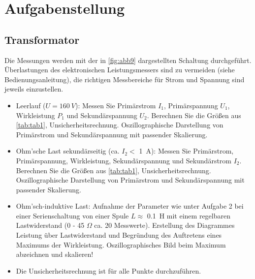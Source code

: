\documentclass[11pt,ngerman]{scrartcl}
\begin{document}

\tableofcontents
\newpage

\section{Aufgabenstellung\label{sec:Auf0}\cite{vorlagetrafo}}

\subsection{Transformator}

Die Messungen werden mit der in \autoref{fig:abb9} dargestellten Schaltung durchgeführt. Überlastungen
des elektronischen Leistungsmessers sind zu vermeiden (siehe Bedienungsanleitung), die richtigen
Messbereiche für Strom und Spannung sind jeweils einzustellen.\cite{vorlagetrafo}

\begin{itemize}
	\item Leerlauf ($U = \SI{160}{V}$): Messen Sie Primärstrom $I_{1}$, Primärspannung $U_1$, Wirkleistung $P_1$
	      und Sekundärspannung $U_2$. Berechnen Sie die Größen aus \autoref{tab:tab1}, Unsicherheitsrechnung.
	      Oszillographische Darstellung von Primärstrom und Sekundärspannung mit passender Skalierung.

	\item Ohm’sche Last sekundärseitig (ca. $I_2 <$ \SI{1}{A}): Messen Sie Primärstrom, Primärspannung,
	      Wirkleistung, Sekundärspannung und Sekundärstrom $I_2$. Berechnen Sie die Größen aus
	      \autoref{tab:tab1}, Unsicherheitsrechnung. Oszillographische Darstellung von Primärstrom und Sekundärspannung mit passender Skalierung.

	\item Ohm’sch-induktive Last: Aufnahme der Parameter wie unter Aufgabe 2 bei einer Serienschaltung
	      von einer Spule $L \approx$ \SI{0.1}{\henry} mit einem regelbaren Lastwiderstand (0 - 45 $\Omega$ ca. 20
	      Messwerte). Erstellung des Diagrammes Leistung über Lastwiderstand und Begründung
	      des Auftretens eines Maximums der Wirkleistung. Oszillographisches Bild beim Maximum
	      abzeichnen und skalieren!

	\item Die Unsicherheitsrechnung ist für alle Punkte durchzuführen.

\end{itemize}
\end{document}
